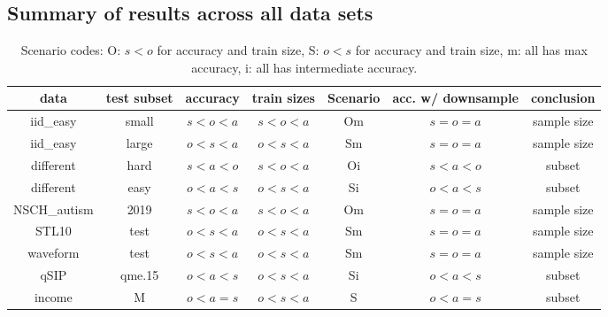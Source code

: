 \documentclass{article}
\begin{document}
\subsection{Summary of results across all data sets}
\begin{table}[]
    \centering
    \begin{tabular}{c|c|c|c|c|c|c}
data  & test subset & accuracy & train sizes & Scenario & acc. w/ downsample & conclusion \\
\hline
iid\_easy & small & $s<o<a$ & $s<o<a$ & Om & $s=o=a$ & sample size \\
iid\_easy & large & $o<s<a$ & $o<s<a$ & Sm & $s=o=a$ & sample size  \\
different & hard & $s<a<o$ & $s<o<a$ & Oi & $s<a<o$ & subset \\
different & easy & $o<a<s$ & $o<s<a$ & Si & $o<a<s$ & subset  \\ 
NSCH\_autism & 2019 & $s<o<a$ & $s<o<a$ & Om & $s=o=a$ & sample size \\
STL10 & test & $o<s<a$ & $o<s<a$ & Sm & $s=o=a$ & sample size  \\
waveform & test & $o<s<a$ & $o<s<a$ & Sm & $s=o=a$ & sample size  \\
qSIP & qme.15 & $o<a<s$ & $o<s<a$ & Si & $o<a<s$ & subset \\
income & M & $o<a=s$ & $o<s<a$ & S & $o<a=s$ & subset
\end{tabular}
    \caption{Scenario codes: O: $s<o$ for accuracy and train size,
S: $o<s$ for accuracy and train size,
m: all has max accuracy,
i: all has intermediate accuracy.
}
    \label{tab:placeholder}
\end{table}




\end{document}
